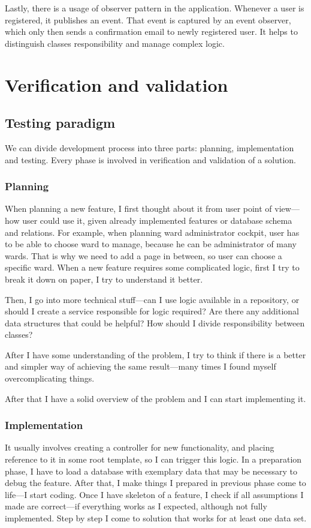 \documentclass[a4paper,twoside,12pt]{book}
\begin{document}
    Lastly, there is a usage of observer pattern in the application. Whenever a user is registered, it publishes an event.
    That event is captured by an event observer, which only then sends a confirmation email to newly registered user.
    It helps to distinguish classes responsibility and manage complex logic.

\chapter{Verification and validation}
  \section{Testing paradigm}
    We can divide development process into three parts: planning, implementation and testing. Every phase is involved in verification and validation of a solution.
      \subsection{Planning}
        When planning a new feature, I first thought about it from user point of view---how user could use it, given already implemented features or database schema and relations.
        For example, when planning ward administrator cockpit, user has to be able to choose ward to manage, because he can be administrator of many wards.
        That is why we need to add a page in between, so user can choose a specific ward.
        When a new feature requires some complicated logic, first I try to break it down on paper, I try to understand it better.

        Then, I go into more technical stuff---can I use logic available in a repository, or should I create a service responsible for logic required?
        Are there any additional data structures that could be helpful?
        How should I divide responsibility between classes?

        After I have some understanding of the problem, I try to think if there is a better and simpler way of achieving the same result---many times I found myself overcomplicating things.

        After that I have a solid  overview of the problem and I can start implementing it.

      \subsection{Implementation}
        It usually involves creating a controller for new functionality, and placing reference to it in some root template, so I can trigger this logic.
        In a preparation phase, I have to load a database with exemplary data that may be necessary to debug the feature.
        After that, I make things I prepared in previous phase come to life---I start coding.
        Once I have skeleton of a feature, I check if all assumptions I made are correct---if everything works as I expected, although not fully implemented.
        Step by step I come to solution that works for at least one data set.
        
\end{document}
